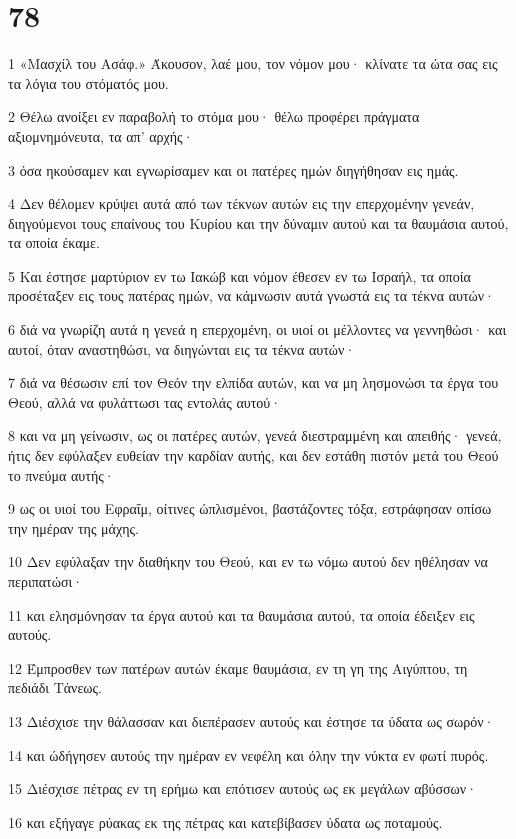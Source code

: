 \chapter{78}

\par 1 «Μασχίλ του Ασάφ.» Άκουσον, λαέ μου, τον νόμον μου· κλίνατε τα ώτα σας εις τα λόγια του στόματός μου.
\par 2 Θέλω ανοίξει εν παραβολή το στόμα μου· θέλω προφέρει πράγματα αξιομνημόνευτα, τα απ' αρχής·
\par 3 όσα ηκούσαμεν και εγνωρίσαμεν και οι πατέρες ημών διηγήθησαν εις ημάς.
\par 4 Δεν θέλομεν κρύψει αυτά από των τέκνων αυτών εις την επερχομένην γενεάν, διηγούμενοι τους επαίνους του Κυρίου και την δύναμιν αυτού και τα θαυμάσια αυτού, τα οποία έκαμε.
\par 5 Και έστησε μαρτύριον εν τω Ιακώβ και νόμον έθεσεν εν τω Ισραήλ, τα οποία προσέταξεν εις τους πατέρας ημών, να κάμνωσιν αυτά γνωστά εις τα τέκνα αυτών·
\par 6 διά να γνωρίζη αυτά η γενεά η επερχομένη, οι υιοί οι μέλλοντες να γεννηθώσι· και αυτοί, όταν αναστηθώσι, να διηγώνται εις τα τέκνα αυτών·
\par 7 διά να θέσωσιν επί τον Θεόν την ελπίδα αυτών, και να μη λησμονώσι τα έργα του Θεού, αλλά να φυλάττωσι τας εντολάς αυτού·
\par 8 και να μη γείνωσιν, ως οι πατέρες αυτών, γενεά διεστραμμένη και απειθής· γενεά, ήτις δεν εφύλαξεν ευθείαν την καρδίαν αυτής, και δεν εστάθη πιστόν μετά του Θεού το πνεύμα αυτής·
\par 9 ως οι υιοί του Εφραΐμ, οίτινες ώπλισμένοι, βαστάζοντες τόξα, εστράφησαν οπίσω την ημέραν της μάχης.
\par 10 Δεν εφύλαξαν την διαθήκην του Θεού, και εν τω νόμω αυτού δεν ηθέλησαν να περιπατώσι·
\par 11 και ελησμόνησαν τα έργα αυτού και τα θαυμάσια αυτού, τα οποία έδειξεν εις αυτούς.
\par 12 Έμπροσθεν των πατέρων αυτών έκαμε θαυμάσια, εν τη γη της Αιγύπτου, τη πεδιάδι Τάνεως.
\par 13 Διέσχισε την θάλασσαν και διεπέρασεν αυτούς και έστησε τα ύδατα ως σωρόν·
\par 14 και ώδήγησεν αυτούς την ημέραν εν νεφέλη και όλην την νύκτα εν φωτί πυρός.
\par 15 Διέσχισε πέτρας εν τη ερήμω και επότισεν αυτούς ως εκ μεγάλων αβύσσων·
\par 16 και εξήγαγε ρύακας εκ της πέτρας και κατεβίβασεν ύδατα ως ποταμούς.
